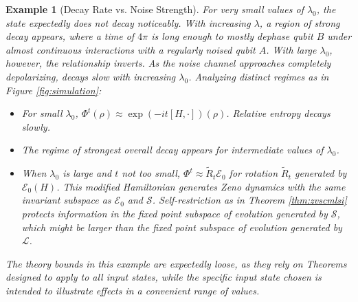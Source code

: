 \documentclass[accepted=2026-02-01, letterpaper]{quantumarticle}
\newtheorem{exam}[lemma]{Example}
\newcommand{\E}{\mathcal{E}}
\renewcommand{\S}{\mathcal{S}}
\renewcommand{\L}{\mathcal{L}}
\newcommand{\Ha}{H}
\begin{document}
\begin{exam}[Decay Rate vs. Noise Strength]
For very small values of $\lambda_0$, the state expectedly does not decay noticeably. With increasing $\lambda$, a region of strong decay appears, where a time of $4 \pi$ is long enough to mostly dephase qubit $B$ under almost continuous interactions with a regularly noised qubit $A$. With large $\lambda_0$, however, the relationship inverts. As the noise channel approaches completely depolarizing, decays slow with increasing $\lambda_0$. Analyzing distinct regimes as in Figure \ref{fig:simulation}:
\begin{itemize}
	\item For small $\lambda_0$, $\Phi^t(\rho) \approx \exp(- i t [\Ha, \cdot])(\rho)$. Relative entropy decays slowly.
	\item The regime of strongest overall decay appears for intermediate values of $\lambda_0$.
	\item When $\lambda_0$ is large and $t$ not too small, $\Phi^t \approx \tilde{R}_t \E_0$ for rotation $\tilde{R}_t$ generated by $\E_0(\Ha)$. This modified Hamiltonian generates Zeno dynamics with the same invariant subspace as $\E_0$ and $\S$.
    Self-restriction as in Theorem \ref{thm:zvscmlsi} protects information in the fixed point subspace of evolution generated by $\S$, which might be larger than the fixed point subspace of evolution generated by $\L$.
\end{itemize}
The theory bounds in this example are \textit{expectedly} loose, as they rely on Theorems designed to apply to all input states, while the specific input state chosen is intended to illustrate effects in a convenient range of values.
\end{exam}
\end{document}
